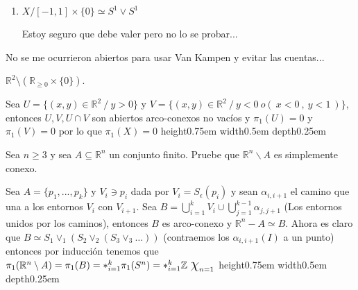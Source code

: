 \documentclass[11pt]{article}
\newcommand{\R}{{\mathbb{R}}}
\newenvironment{proof}[1][Demostraci\'on]{\begin{trivlist}
\item[\hskip \labelsep {\bfseries #1}]}{\end{trivlist}}
\newenvironment{remark}[1][Observaci\'on]{\begin{trivlist}
\item[\hskip \labelsep {\bfseries #1}]}{\end{trivlist}}
\newcommand{\qed}{\nobreak \ifvmode \relax \else
      \ifdim\lastskip<1.5em \hskip-\lastskip
      \hskip1.5em plus0em minus0.5em \fi \nobreak
      \vrule height0.75em width0.5em depth0.25em\fi}
\newcommand{\Z}{\mathbb{Z}}
\begin{document}
\begin{enumerate}
\begin{enumerate}
\begin{proof}
\begin{proof}
\begin{enumerate}
\item $X / [-1,1] \times \{0\} \simeq S^1 \vee S^1$

Estoy seguro que debe valer pero no lo se probar...

\end{enumerate}

\end{proof}

\end{proof}

\begin{remark}

No se me ocurrieron abiertos para usar Van Kampen y evitar las cuentas...

\end{remark}



\item $\R^2\setminus(\R_{\geq 0}\times\{0\})$.

\begin{proof}

Sea $U = \{(x,y) \in \R^2 \ / \ y > 0\}$ y $V = \{ (x,y) \in \R^2 \ / \ y < 0 \ o ( \ x < 0 \ , \ y < 1 \  ) \}$, entonces $U,V, U \cap V$ son abiertos arco-conexos no vac\'ios y $\pi_1(U)= 0$ y $\pi_1(V) = 0$ por lo que $\pi_1(X) = 0$ \qed

\end{proof}

\end{enumerate}



\item {Sea $n\geq 3$ y sea $A \subseteq \R^n$ un conjunto finito. Pruebe que $\R^n \smallsetminus A$ es simplemente conexo.
}

\begin{proof}

Sea $A = \{p_1,...,p_k\}$ y $V_i \ni p_i$ dada por $V_i =S_{\epsilon}(p_i)$ y sean $\alpha_{i,i+1}$ el camino que una a los entornos $V_i$ con $V_{i+1}$. Sea $B = \bigcup_{i=1}^{k}{V_i} \cup \bigcup_{j=1}^{k-1}{\alpha_{j,j+1}}$ (Los entornos unidos por los caminos), entonces $B$ es arco-conexo y $\R^n -A \simeq B$. Ahora es claro que $B \simeq S_1 \vee_{1} (S_2 \vee_{2} (S_3 \vee_3 \dots))$ (contraemos los $\alpha_{i,i+1}(I)$ a un punto) entonces por inducci\'on tenemos que $\pi_1(\R^n \setminus A) = \pi_1(B) = \ast_{i=1}^{k} {\pi_1(S^n)} = \ast_{i=1}^{k} {\Z \ \mbox{\Large$\chi$}_{n=1}}$ \qed

\end{proof}



\end{enumerate}
\end{document}
